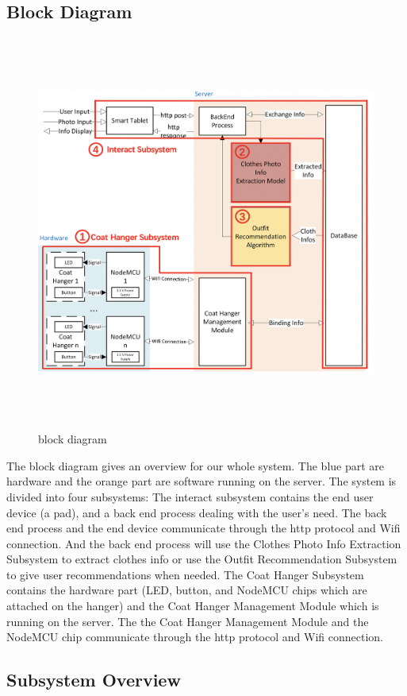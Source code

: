 \subsection{Block Diagram}
\begin{figure}[h]
    \centering
    \includegraphics[width=14cm,height=13cm]{graph/block diagram.png}
    \caption{block diagram}
    \end{figure}


The block diagram gives an overview for our whole system. The blue part are hardware and the orange part are software running on the server. The system is divided into four subsystems: The interact subsystem contains the end user device (a pad), and a back end process dealing with the user's need. The back end process and the end device communicate through the http protocol and Wifi connection. And the back end process will use the Clothes Photo Info Extraction Subsystem to extract clothes info or use the Outfit Recommendation Subsystem to give user recommendations when needed. The Coat Hanger Subsystem contains the hardware part (LED, button, and NodeMCU chips which are attached on the hanger) and the Coat Hanger Management Module which is running on the server. The the Coat Hanger Management Module and the NodeMCU chip communicate through the http protocol and Wifi connection. 

\subsection{Subsystem Overview}
